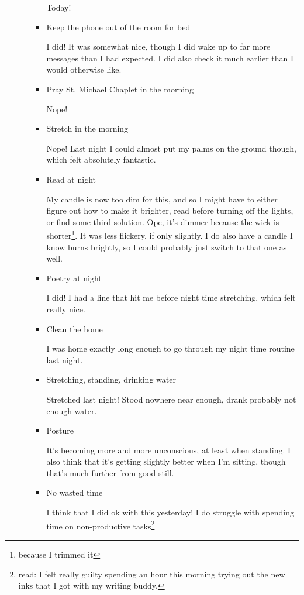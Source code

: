 \documentclass[12pt]{article}
\renewcommand{\,}{\textsuperscript{,}}
\begin{document}
\begin{itemize}
\begin{itemize}
\begin{itemize}
Today!

\item Keep the phone out of the room for bed

I did! It was somewhat nice, though I did wake up to far more messages than I had expected.  
I did also check it much earlier than I would otherwise like.

\item Pray St. Michael Chaplet in the morning

Nope!

\item Stretch in the morning

Nope! Last night I could almost put my palms on the ground though, which felt absolutely fantastic.

\item Read at night

My candle is now too dim for this, and so I might have to either figure out how to make it brighter, read before turning off the lights, or find some third solution. Ope, it's dimmer because the wick is shorter\footnote{because I trimmed it}. It was less flickery, if only slightly. I do also have a candle I know burns brightly, so I could probably just switch to that one as well.

\item Poetry at night

I did! I had a line that hit me before night time stretching, which felt really nice.

\item Clean the home

I was home exactly long enough to go through my night time routine last night.

\item Stretching, standing, drinking water

Stretched last night! Stood nowhere near enough, drank probably not enough water.

\item Posture

It's becoming more and more unconscious, at least when standing. I also think that it's getting slightly better when I'm sitting, though that's much further from good still.

\item No wasted time

I think that I did ok with this yesterday! I do struggle with spending time on non-productive tasks\footnote{read: I felt really guilty spending an hour this morning trying out the new inks that I got with my writing buddy.}


\end{itemize}
\end{itemize}
\end{itemize}
\end{document}
